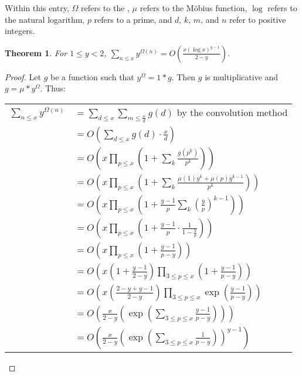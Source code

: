 \documentclass[12pt]{article}
\newtheorem*{thm*}{Theorem}
\begin{document}
Within this entry, $\Omega$ refers to the , $\mu$ refers to the M\"{o}bius function, $\log$ refers to the natural logarithm, $p$ refers to a prime, and $d$, $k$, $m$, and $n$ refer to positive integers.

\begin{thm*}
For $1 \le y<2$, $\displaystyle \sum_{n \le x} y^{\Omega(n)}=O\left( \frac{x(\log x)^{y-1}}{2-y} \right)$.
\end{thm*}

\begin{proof}
Let $g$ be a function such that $y^{\Omega}=1*g$.  Then $g$ is multiplicative and $g=\mu*y^{\Omega}$.  Thus:

\begin{center}
\begin{tabular}{ll}
$\displaystyle \sum_{n \le x} y^{\Omega(n)}$ & $\displaystyle =\sum_{d \le x} \sum_{m \le \frac{x}{d}} g(d)$ by the convolution method \\
& $\displaystyle =O\left( \sum_{d \le x} g(d) \cdot \frac{x}{d} \right)$ \\
& $\displaystyle =O\left( x \prod_{p \le x} \left( 1+\sum_{k} \frac{g(p^k)}{p^k} \right) \right)$ \\
& $\displaystyle =O\left( x \prod_{p \le x} \left( 1+\sum_{k} \frac{\mu(1)y^k+\mu(p)y^{k-1}}{p^k} \right) \right)$ \\
& $\displaystyle =O\left( x \prod_{p \le x} \left( 1+\frac{y-1}{p} \sum_{k} \left( \frac{y}{p} \right)^{k-1} \right) \right)$ \\
& $\displaystyle =O\left( x \prod_{p \le x} \left( 1+\frac{y-1}{p} \cdot \frac{1}{1-\frac{y}{p}} \right) \right)$ \\
& $\displaystyle =O\left( x \prod_{p \le x} \left( 1+\frac{y-1}{p-y} \right) \right)$ \\
& $\displaystyle =O\left( x \left(1+\frac{y-1}{2-y} \right) \prod_{3 \le p \le x} \left( 1+\frac{y-1}{p-y} \right) \right)$ \\
& $\displaystyle =O\left( x \left(\frac{2-y+y-1}{2-y} \right) \prod_{3 \le p \le x} \exp \left(\frac{y-1}{p-y} \right) \right)$ \\
& $\displaystyle =O\left( \frac{x}{2-y} \left( \exp \left(\sum_{3 \le p \le x} \frac{y-1}{p-y} \right) \right) \right)$ \\
& $\displaystyle =O\left( \frac{x}{2-y} \left( \exp \left( \sum_{3 \le p \le x} \frac{1}{p-y} \right) \right)^{y-1} \right)$ \\

\end{tabular}
\end{center}
\end{proof}
\end{document}
